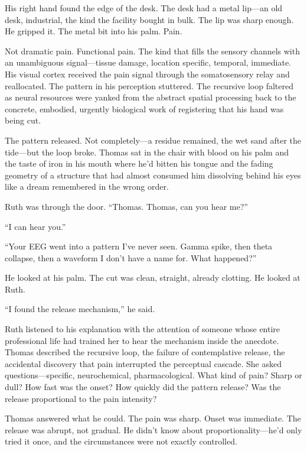His right hand found the edge of the desk. The desk had a metal lip---an old desk, industrial, the kind the facility bought in bulk. The lip was sharp enough. He gripped it. The metal bit into his palm. Pain.

Not dramatic pain. Functional pain. The kind that fills the sensory channels with an unambiguous signal---tissue damage, location specific, temporal, immediate. His visual cortex received the pain signal through the somatosensory relay and reallocated. The pattern in his perception stuttered. The recursive loop faltered as neural resources were yanked from the abstract spatial processing back to the concrete, embodied, urgently biological work of registering that his hand was being cut.

The pattern released. Not completely---a residue remained, the wet sand after the tide---but the loop broke. Thomas sat in the chair with blood on his palm and the taste of iron in his mouth where he'd bitten his tongue and the fading geometry of a structure that had almost consumed him dissolving behind his eyes like a dream remembered in the wrong order.

Ruth was through the door. ``Thomas. Thomas, can you hear me?''

``I can hear you.''

``Your EEG went into a pattern I've never seen. Gamma spike, then theta collapse, then a waveform I don't have a name for. What happened?''

He looked at his palm. The cut was clean, straight, already clotting. He looked at Ruth.

``I found the release mechanism,'' he said.

\scenebreak

Ruth listened to his explanation with the attention of someone whose entire professional life had trained her to hear the mechanism inside the anecdote. Thomas described the recursive loop, the failure of contemplative release, the accidental discovery that pain interrupted the perceptual cascade. She asked questions---specific, neurochemical, pharmacological. What kind of pain? Sharp or dull? How fast was the onset? How quickly did the pattern release? Was the release proportional to the pain intensity?

Thomas answered what he could. The pain was sharp. Onset was immediate. The release was abrupt, not gradual. He didn't know about proportionality---he'd only tried it once, and the circumstances were not exactly controlled.


